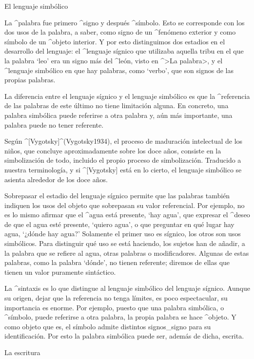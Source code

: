 \Section El lenguaje simbólico

La ^{palabra} fue primero ^{signo} y después ^{símbolo}. Esto se
corresponde con los dos usos de la palabra, a saber, como signo de un
^{fenómeno} exterior y como símbolo de un ^{objeto} interior. Y por esto
distinguimos dos estadios en el desarrollo del lenguaje: el ^{lenguaje
sígnico} que utilizaba aquella tribu en el que la palabra `leo' era un
signo más del ^{león}, visto en ^>La palabra>, y el ^{lenguaje
simbólico} en que hay palabras, como `verbo', que son signos de las
propias palabras.

La diferencia entre el lenguaje sígnico y el lenguaje simbólico es que
la ^{referencia} de las palabras de este último no tiene limitación
alguna. En concreto, una palabra simbólica puede referirse a otra
palabra y, aún más importante, una palabra puede no tener referente.

Según ^[Vygotsky]^(Vygotsky1934), el proceso de maduración intelectual
de los niños, que concluye aproximadamente sobre los doce años, consiste
en la simbolización de todo, incluido el propio proceso de
simbolización. Traducido a nuestra terminología, y si ^[Vygotsky] está
en lo cierto, el lenguaje simbólico se asienta alrededor de los doce
años.

Sobrepasar el estadio del lenguaje sígnico permite que las palabras
también indiquen los usos del objeto que sobrepasan su valor
referencial. Por ejemplo, no es lo mismo afirmar que el ^{agua} está
presente, `hay agua', que expresar el ^{deseo} de que el agua esté
presente, `quiero agua', o que preguntar en qué lugar hay agua, `¿dónde
hay agua?' Solamente el primer uso es sígnico, los otros son usos
simbólicos. Para distinguir qué uso se está haciendo, los sujetos han de
añadir, a la palabra que se refiere al agua, otras palabras o
modificadores. Algunas de estas palabras, como la palabra `dónde', no
tienen referente; diremos de ellas que tienen un valor puramente
sintáctico.

La ^{sintaxis} es lo que distingue al lenguaje simbólico del lenguaje
sígnico. Aunque su origen, dejar que la referencia no tenga límites, es
poco espectacular, su importancia es enorme. Por ejemplo, puesto que una
palabra simbólica, o ^{símbolo}, puede referirse a otra palabra, la
propia palabra se hace ^{objeto}. Y como objeto que es, el símbolo
admite distintos signos_{signo} para su identificación. Por esto la
palabra simbólica puede ser, además de dicha, escrita.


\Section La escritura

